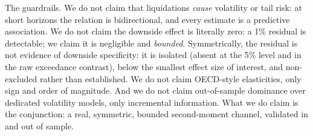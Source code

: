The guardrails. We do not claim that liquidations
\emph{cause} volatility or tail risk: at short horizons the relation is
bidirectional, and every estimate is a predictive association. We do not
claim the downside effect is literally zero: a 1\% residual is detectable;
we claim it is negligible and \emph{bounded}. Symmetrically, the residual
is not evidence of downside specificity: it is isolated (absent at the
5\% level and in the raw exceedance contrast), below the smallest effect
size of interest, and non-excluded rather than established. We do not
claim OECD-style elasticities, only sign and order of magnitude. And
we do not claim out-of-sample dominance over dedicated volatility models,
only incremental information. What we do claim is the conjunction:
a real, symmetric, bounded second-moment channel, validated in and out
of sample.